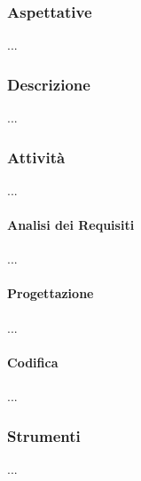     \subsubsection{Aspettative}
        ...
    \subsubsection{Descrizione}
        ...
    \subsubsection{Attività}
        ...
        \paragraph{Analisi dei Requisiti}
            ...
        \paragraph{Progettazione}
            ...
        \paragraph{Codifica}
            ...
    \subsubsection{Strumenti}
        ...